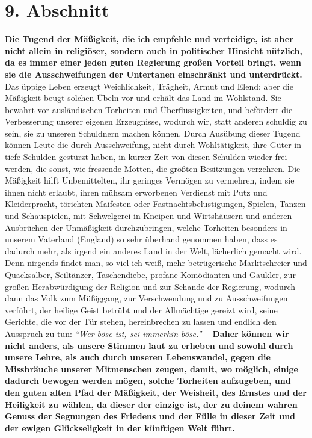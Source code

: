 \section{9. Abschnitt} \label{kap18_ab9}

\label{ref:18_09_gesellschaftlich} \textbf{Die Tugend der Mäßigkeit, die ich
empfehle und verteidige, ist aber nicht
allein in religiöser, sondern auch in politischer Hinsicht
nützlich, da es immer
einer jeden guten Regierung großen Vorteil bringt, wenn sie die
Ausschweifungen der Untertanen einschränkt und unterdrückt.} Das üppige Leben
erzeugt Weichlichkeit, Trägheit, Armut und Elend;
aber die Mäßigkeit beugt
solchen Übeln vor und erhält das Land im Wohlstand.
Sie bewahrt vor ausländischen Torheiten und
Überflüssigkeiten, und befördert die Verbesserung unserer eigenen Erzeugnisse,
wodurch wir, statt anderen schuldig zu sein, sie zu unseren Schuldnern machen
können. Durch Ausübung dieser Tugend können Leute die durch Ausschweifung, nicht
durch Wohltätigkeit, ihre Güter in tiefe Schulden gestürzt haben, in kurzer
Zeit von diesen Schulden wieder frei werden, die sonst, wie fressende Motten,
die größten Besitzungen verzehren. Die Mäßigkeit hilft Unbemittelten, ihr
geringes Vermögen zu vermehren, indem sie ihnen nicht erlaubt, ihren mühsam
erworbenen Verdienst mit Putz und Kleiderpracht, törichten Maifesten oder
Fastnachtsbelustigungen, Spielen, Tanzen und Schauspielen, mit
Schwelgerei in
Kneipen und Wirtshäusern und anderen Ausbrüchen der
Unmäßigkeit durchzubringen,
welche Torheiten besonders in unserem Vaterland (England)
so sehr überhand
genommen haben, dass es dadurch mehr, als irgend ein anderes Land in der Welt,
lächerlich gemacht wird. Denn nirgends findet man, so viel ich weiß, mehr
betrügerische Marktschreier und Quacksalber,
Seiltänzer,
Taschendiebe, profane
Komödianten und Gaukler, zur großen Herabwürdigung der
Religion
und zur Schande
der Regierung, wodurch dann das Volk zum Müßiggang, zur
Verschwendung und zu
Ausschweifungen verführt, der heilige Geist betrübt und der Allmächtige gereizt
wird, seine Gerichte, die vor der Tür stehen, hereinbrechen zu lassen und
endlich den Ausspruch zu tun:
\textit{"`Wer böse ist, sei immerhin böse."'}
\label{ref:18_09_lautstark} \textbf{-- Daher
können wir nicht anders, als unsere
Stimmen laut zu erheben und sowohl durch unsere Lehre, als auch durch unseren
Lebenswandel, gegen die Missbräuche unserer Mitmenschen zeugen, damit, wo
möglich, einige dadurch bewogen werden mögen, solche Torheiten aufzugeben,
und den guten alten Pfad der Mäßigkeit, der Weisheit, des Ernstes und der
Heiligkeit zu wählen, da dieser der einzige ist, der zu deinem wahren Genuss
der Segnungen des Friedens und der Fülle in dieser Zeit und der ewigen
Glückseligkeit in der künftigen Welt führt.}

